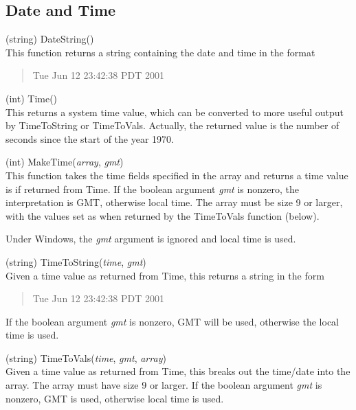 \subsection{Date and Time}

\begin{description}
\item{(string) \vt DateString()}\\
This function returns a string containing the date and time in
the format
\begin{quote}\vt
    Tue Jun 12 23:42:38 PDT 2001
\end{quote}

\item{(int) \vt Time()}\\
This returns a system time value, which can be converted to more
useful output by {\vt TimeToString} or {\vt TimeToVals}.  Actually,
the returned value is the number of seconds since the start of the
year 1970.

\item{(int) \vt MakeTime({\it array\/}, {\it gmt\/})}\\
This function takes the time fields specified in the array and returns
a time value is if returned from {\vt Time}.  If the boolean argument
{\it gmt} is nonzero, the interpretation is GMT, otherwise local time. 
The array must be size 9 or larger, with the values set as when
returned by the {\vt TimeToVals} function (below).

Under Windows, the {\it gmt} argument is ignored and local time is used.

\item{(string) \vt TimeToString({\it time\/}, {\it gmt\/})}\\
Given a time value as returned from {\vt Time}, this returns a 
string in the form
\begin{quote} \vt
Tue Jun 12 23:42:38 PDT 2001
\end{quote}

If the boolean argument {\it gmt} is nonzero, GMT will be used,
otherwise the local time is used.

\item{(string) \vt TimeToVals({\it time\/}, {\it gmt\/}, {\it array\/})}\\
Given a time value as returned from {\vt Time}, this breaks out the
time/date into the array.  The array must have size 9 or larger.  If
the boolean argument {\it gmt} is nonzero, GMT is used, otherwise
local time is used.
  

\end{description}
